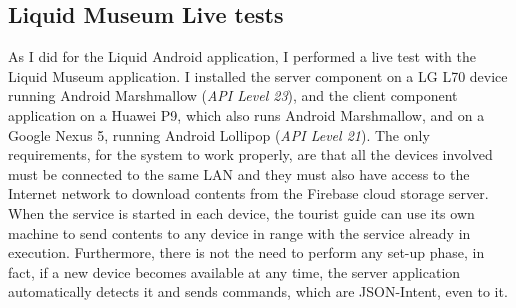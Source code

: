 \subsection{Liquid Museum Live tests}
As I did for the Liquid Android application, I performed a live test with the Liquid Museum application. I installed the server component on a LG L70 device running Android Marshmallow (\textit{API Level 23}), and the client component application on a Huawei P9, which also runs Android Marshmallow, and on a Google Nexus 5, running Android Lollipop (\textit{API Level 21}). The only requirements, for the system to work properly, are that all the devices involved must be connected to the same LAN and they must also have access to the Internet network to download contents from the Firebase cloud storage server. When the service is started in each device, the tourist guide can use its own machine to send contents to any device in range with the service already in execution. Furthermore, there is not the need to perform any set-up phase, in fact, if a new device becomes available at any time, the server application automatically detects it and sends commands, which are JSON-Intent, even to it.
